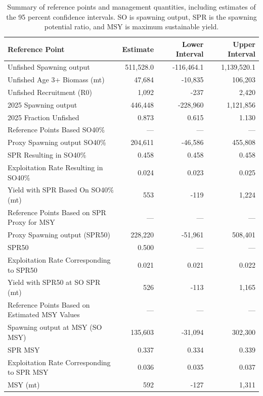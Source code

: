\documentclass[
]{scrartcl}
\begin{document}
\clearpage

\begingroup
\fontsize{9.0pt}{10.8pt}\selectfont

\begin{longtable}{lrrr}

\caption{\label{tbl-ref-points-es}Summary of reference points and
management quantities, including estimates of the 95 percent confidence
intervals. SO is spawning output, SPR is the spawning potential ratio,
and MSY is maximum sustainable yield.}

\tabularnewline

\toprule
Reference Point & Estimate & Lower Interval & Upper Interval \\ 
\midrule\addlinespace[2.5pt]
Unfished Spawning output & 511,528.0 & -116,464.1 & 1,139,520.1 \\ 
Unfished Age 3+ Biomass (mt) & 47,684 & -10,835 & 106,203 \\ 
Unfished Recruitment (R0) & 1,092 & -237 & 2,420 \\ 
2025 Spawning output & 446,448 & -228,960 & 1,121,856 \\ 
2025 Fraction Unfished & 0.873 & 0.615 & 1.130 \\ 
Reference Points Based SO40\% & — & — & — \\ 
Proxy Spawning output SO40\% & 204,611 & -46,586 & 455,808 \\ 
SPR Resulting in SO40\% & 0.458 & 0.458 & 0.458 \\ 
Exploitation Rate Resulting in SO40\% & 0.024 & 0.023 & 0.025 \\ 
Yield with SPR Based On SO40\% (mt) & 553 & -119 & 1,224 \\ 
Reference Points Based on SPR Proxy for MSY & — & — & — \\ 
Proxy Spawning output (SPR50) & 228,220 & -51,961 & 508,401 \\ 
SPR50 & 0.500 & — & — \\ 
Exploitation Rate Corresponding to SPR50 & 0.021 & 0.021 & 0.022 \\ 
Yield with SPR50 at SO SPR (mt) & 526 & -113 & 1,165 \\ 
Reference Points Based on Estimated MSY Values & — & — & — \\ 
Spawning output at MSY (SO MSY) & 135,603 & -31,094 & 302,300 \\ 
SPR MSY & 0.337 & 0.334 & 0.339 \\ 
Exploitation Rate Corresponding to SPR MSY & 0.036 & 0.035 & 0.037 \\ 
MSY (mt) & 592 & -127 & 1,311 \\ 
\bottomrule

\end{longtable}
\end{document}
